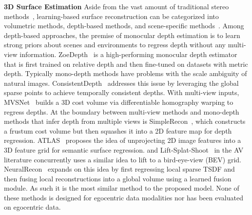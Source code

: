 \noindent\textbf{3D Surface Estimation} Aside from the vast amount of traditional stereo methods~\cite{furukawa2009accurate,goesele2007multi}, learning-based surface reconstruction can be categorized into volumetric methods, depth-based methods, and scene-specific methods~\cite{mildenhall2021nerf,kerbl3Dgaussians}. 
Among depth-based approaches, the premise of monocular depth estimation is to learn strong priors about scenes and environments to regress depth without any multi-view information. ZoeDepth~\cite{bhat2023zoedepth} is a high-performing monocular depth estimator that is first trained on relative depth and then fine-tuned on datasets with metric depth. Typically mono-depth methods have problems with the scale ambiguity of natural images. %
ConsistentDepth~\cite{khan2023tcod} addresses this issue by leveraging the global sparse points to achieve temporally consistent depths. With multi-view inputs, MVSNet~\cite{yao2018mvsnet} builds a 3D cost volume via differentiable homography warping to regress depths. At the boundary between multi-view methods and mono-depth methods that infer depth from multiple views is SimpleRecon~\cite{sayed2022simplerecon}, which constructs a frustum cost volume but then squashes it into a 2D feature map for depth regression.
ATLAS~\cite{murez2020atlas} proposes the idea of unprojecting 2D image features into a 3D feature grid for semantic surface regression. and Lift-Splat-Shoot~\cite{philion2020lift} in the AV literature concurrently uses a similar idea to lift to a bird-eye-view (BEV) grid. 
NeuralRecon~\cite{sun2021neucon} expands on this idea by first regressing local sparse TSDF and then fusing local reconstructions into a global volume using a learned fusion module. As such it is the most similar method to the proposed \EFMmodel{} model.
%
None of these methods is designed for egocentric data modalities nor has been evaluated on egocentric data.
